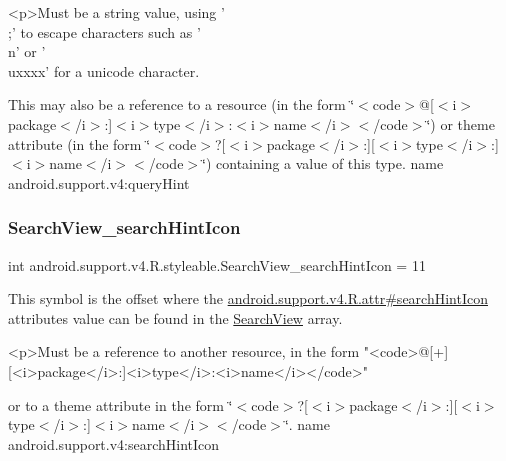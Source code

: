 \begin{DoxyVerb}      <p>Must be a string value, using '\\;' to escape characters such as '\\n' or '\\uxxxx' for a unicode character.
\end{DoxyVerb}
 

This may also be a reference to a resource (in the form \char`\"{}$<$code$>$@\mbox{[}$<$i$>$package$<$/i$>$\+:\mbox{]}$<$i$>$type$<$/i$>$\+:$<$i$>$name$<$/i$>$$<$/code$>$\char`\"{}) or theme attribute (in the form \char`\"{}$<$code$>$?\mbox{[}$<$i$>$package$<$/i$>$\+:\mbox{]}\mbox{[}$<$i$>$type$<$/i$>$\+:\mbox{]}$<$i$>$name$<$/i$>$$<$/code$>$\char`\"{}) containing a value of this type.  name android.\+support.\+v4\+:query\+Hint \mbox{\label{classandroid_1_1support_1_1v4_1_1R_1_1styleable_a061d67b6fc4b4b493ef5993fa1bcf0ce}} 
\subsubsection{\texorpdfstring{Search\+View\+\_\+search\+Hint\+Icon}{SearchView\_searchHintIcon}}
{\footnotesize\ttfamily int android.\+support.\+v4.\+R.\+styleable.\+Search\+View\+\_\+search\+Hint\+Icon = 11\hspace{0.3cm}{\ttfamily [static]}}

This symbol is the offset where the \hyperlink{classandroid_1_1support_1_1v4_1_1R_1_1attr_a4ee7e6e81237caeac9648d5b6ce2f5df}{android.\+support.\+v4.\+R.\+attr\#search\+Hint\+Icon} attribute\textquotesingle{}s value can be found in the \hyperlink{classandroid_1_1support_1_1v4_1_1R_1_1styleable_a7f709410d566e9fd5d4c710e815c300a}{Search\+View} array.

\begin{DoxyVerb}      <p>Must be a reference to another resource, in the form "<code>@[+][<i>package</i>:]<i>type</i>:<i>name</i></code>"
\end{DoxyVerb}
 or to a theme attribute in the form \char`\"{}$<$code$>$?\mbox{[}$<$i$>$package$<$/i$>$\+:\mbox{]}\mbox{[}$<$i$>$type$<$/i$>$\+:\mbox{]}$<$i$>$name$<$/i$>$$<$/code$>$\char`\"{}.  name android.\+support.\+v4\+:search\+Hint\+Icon \mbox{\label{classandroid_1_1support_1_1v4_1_1R_1_1styleable_ab225bc2b5b5cdc07178516697d75824e}} 

